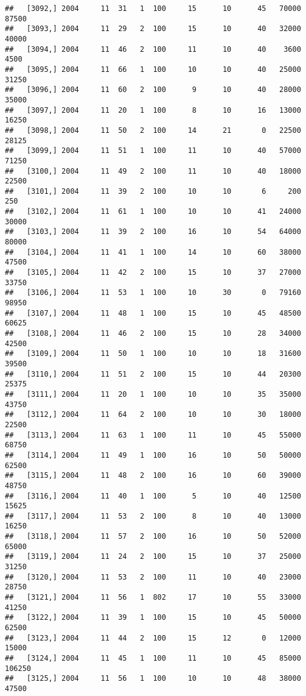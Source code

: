 \documentclass{article}\usepackage[]{graphicx}\usepackage[]{color}
\makeatletter
\newenvironment{kframe}{%
 \def\at@end@of@kframe{}%
 \ifinner\ifhmode%
  \def\at@end@of@kframe{\end{minipage}}%
  \begin{minipage}{\columnwidth}%
 \fi\fi%
 \def\FrameCommand##1{\hskip\@totalleftmargin \hskip-\fboxsep
 \colorbox{shadecolor}{##1}\hskip-\fboxsep
     \hskip-\linewidth \hskip-\@totalleftmargin \hskip\columnwidth}%
 \MakeFramed {\advance\hsize-\width
   \@totalleftmargin\z@ \linewidth\hsize
   \@setminipage}}%
 {\par\unskip\endMakeFramed%
 \at@end@of@kframe}
\newenvironment{knitrout}{}{} %
\makeatother
\begin{document}
\begin{knitrout}
\begin{kframe}
\begin{verbatim}
##   [3092,] 2004     11  31   1  100     15      10      45   70000   87500
##   [3093,] 2004     11  29   2  100     15      10      40   32000   40000
##   [3094,] 2004     11  46   2  100     11      10      40    3600    4500
##   [3095,] 2004     11  66   1  100     10      10      40   25000   31250
##   [3096,] 2004     11  60   2  100      9      10      40   28000   35000
##   [3097,] 2004     11  20   1  100      8      10      16   13000   16250
##   [3098,] 2004     11  50   2  100     14      21       0   22500   28125
##   [3099,] 2004     11  51   1  100     11      10      40   57000   71250
##   [3100,] 2004     11  49   2  100     11      10      40   18000   22500
##   [3101,] 2004     11  39   2  100     10      10       6     200     250
##   [3102,] 2004     11  61   1  100     10      10      41   24000   30000
##   [3103,] 2004     11  39   2  100     16      10      54   64000   80000
##   [3104,] 2004     11  41   1  100     14      10      60   38000   47500
##   [3105,] 2004     11  42   2  100     15      10      37   27000   33750
##   [3106,] 2004     11  53   1  100     10      30       0   79160   98950
##   [3107,] 2004     11  48   1  100     15      10      45   48500   60625
##   [3108,] 2004     11  46   2  100     15      10      28   34000   42500
##   [3109,] 2004     11  50   1  100     10      10      18   31600   39500
##   [3110,] 2004     11  51   2  100     15      10      44   20300   25375
##   [3111,] 2004     11  20   1  100     10      10      35   35000   43750
##   [3112,] 2004     11  64   2  100     10      10      30   18000   22500
##   [3113,] 2004     11  63   1  100     11      10      45   55000   68750
##   [3114,] 2004     11  49   1  100     16      10      50   50000   62500
##   [3115,] 2004     11  48   2  100     16      10      60   39000   48750
##   [3116,] 2004     11  40   1  100      5      10      40   12500   15625
##   [3117,] 2004     11  53   2  100      8      10      40   13000   16250
##   [3118,] 2004     11  57   2  100     16      10      50   52000   65000
##   [3119,] 2004     11  24   2  100     15      10      37   25000   31250
##   [3120,] 2004     11  53   2  100     11      10      40   23000   28750
##   [3121,] 2004     11  56   1  802     17      10      55   33000   41250
##   [3122,] 2004     11  39   1  100     15      10      45   50000   62500
##   [3123,] 2004     11  44   2  100     15      12       0   12000   15000
##   [3124,] 2004     11  45   1  100     11      10      45   85000  106250
##   [3125,] 2004     11  56   1  100     10      10      48   38000   47500

\end{verbatim}
\end{kframe}
\end{knitrout}
\end{document}
